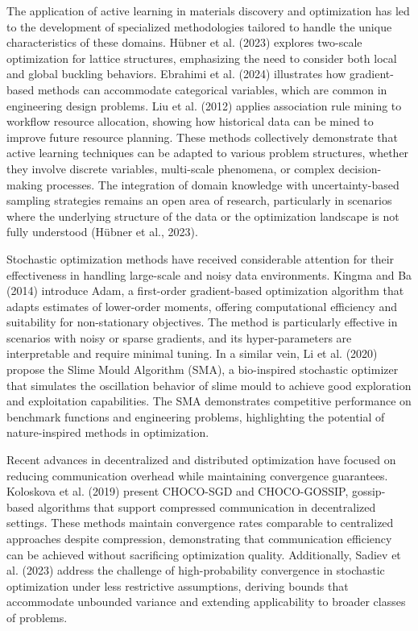 The application of active learning in materials discovery and optimization has led to the development of specialized methodologies tailored to handle the unique characteristics of these domains. Hübner et al. (2023) explores two-scale optimization for lattice structures, emphasizing the need to consider both local and global buckling behaviors. Ebrahimi et al. (2024) illustrates how gradient-based methods can accommodate categorical variables, which are common in engineering design problems. Liu et al. (2012) applies association rule mining to workflow resource allocation, showing how historical data can be mined to improve future resource planning. These methods collectively demonstrate that active learning techniques can be adapted to various problem structures, whether they involve discrete variables, multi-scale phenomena, or complex decision-making processes. The integration of domain knowledge with uncertainty-based sampling strategies remains an open area of research, particularly in scenarios where the underlying structure of the data or the optimization landscape is not fully understood (Hübner et al., 2023).

Stochastic optimization methods have received considerable attention for their effectiveness in handling large-scale and noisy data environments. Kingma and Ba (2014) introduce Adam, a first-order gradient-based optimization algorithm that adapts estimates of lower-order moments, offering computational efficiency and suitability for non-stationary objectives. The method is particularly effective in scenarios with noisy or sparse gradients, and its hyper-parameters are interpretable and require minimal tuning. In a similar vein, Li et al. (2020) propose the Slime Mould Algorithm (SMA), a bio-inspired stochastic optimizer that simulates the oscillation behavior of slime mould to achieve good exploration and exploitation capabilities. The SMA demonstrates competitive performance on benchmark functions and engineering problems, highlighting the potential of nature-inspired methods in optimization.

Recent advances in decentralized and distributed optimization have focused on reducing communication overhead while maintaining convergence guarantees. Koloskova et al. (2019) present CHOCO-SGD and CHOCO-GOSSIP, gossip-based algorithms that support compressed communication in decentralized settings. These methods maintain convergence rates comparable to centralized approaches despite compression, demonstrating that communication efficiency can be achieved without sacrificing optimization quality. Additionally, Sadiev et al. (2023) address the challenge of high-probability convergence in stochastic optimization under less restrictive assumptions, deriving bounds that accommodate unbounded variance and extending applicability to broader classes of problems.


